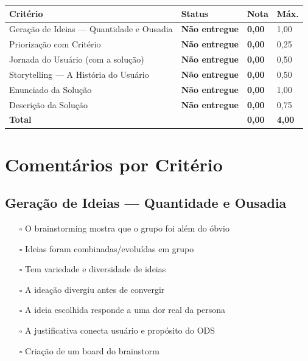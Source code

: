 \documentclass[
  sigconf,
  nonacm, %
  language=portuguese
]{acmart}
\newcommand{\statuswarn}[1]{{\small\bfseries\color{cwarn}#1}}
\begin{document}
\begin{tabular}{@{} L{2.6cm} C{2.5cm} C{1.1cm} C{1.1cm} @{}}
\toprule
\textbf{Critério} & \textbf{Status} & \textbf{Nota} & \textbf{Máx.} \\
\midrule
Geração de Ideias — Quantidade e Ousadia & \statuswarn{Não entregue} & \textbf{0,00} & 1,00 \\
Priorização com Critério & \statuswarn{Não entregue} & \textbf{0,00} & 0,25 \\
Jornada do Usuário (com a solução) & \statuswarn{Não entregue} & \textbf{0,00} & 0,50 \\
Storytelling — A História do Usuário & \statuswarn{Não entregue} & \textbf{0,00} & 0,50 \\
Enunciado da Solução & \statuswarn{Não entregue} & \textbf{0,00} & 1,00 \\
Descrição da  Solução & \statuswarn{Não entregue} & \textbf{0,00} & 0,75 \\
\midrule
\textbf{Total} & & \textbf{\color{cred}0,00} & \textbf{4,00} \\
\bottomrule
\end{tabular}

\section{Comentários por Critério}

\subsection{Geração de Ideias — Quantidade e Ousadia}

\noindent\statuswarn{0,00\,/\,1,00 pts · Não entregue}

\begin{itemize}[leftmargin=14pt,itemsep=1pt,topsep=3pt,parsep=0pt]
  \item[$\square$] {\small\textcolor{cmuted}{O brainstorming mostra que o grupo foi além do óbvio}}
  \item[$\square$] {\small\textcolor{cmuted}{Ideias foram combinadas/evoluídas em grupo}}
  \item[$\square$] {\small\textcolor{cmuted}{Tem variedade e diversidade de ideias}}
  \item[$\square$] {\small\textcolor{cmuted}{A ideação divergiu antes de convergir}}
  \item[$\square$] {\small\textcolor{cmuted}{A ideia escolhida responde a uma dor real da persona}}
  \item[$\square$] {\small\textcolor{cmuted}{A justificativa conecta usuário e propósito do ODS}}
  \item[$\square$] {\small\textcolor{cmuted}{Criação de um board do brainstorm}}
\end{itemize}
\end{document}

